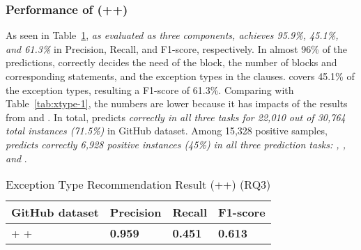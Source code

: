 \subsubsection{Performance of {\tool} ({\xblock}+{\xstate}+{\xtype})}




As seen in Table~\ref{tab:xtype-4}, {\em {\tool} as evaluated as three
  components, achieves 95.9\%, 45.1\%, and 61.3\%} in Precision,
Recall, and F1-score, respectively. In almost 96\% of the predictions,
{\tool} correctly decides the need of the  block, the
number of blocks and corresponding statements, and the exception types
in the  clauses. {\tool} covers 45.1\% of the exception
types, resulting a F1-score of 61.3\%.
%
Comparing with Table~\ref{tab:xtype-1}, the numbers are lower because
it has impacts of the results from \xblock and \xstate. In total,
{\tool} predicts {\em correctly in all three tasks for 22,010 out of
  30,764 total instances (71.5\%)} in GitHub dataset. Among 15,328
positive samples, {\em {\tool} predicts correctly 6,928 positive
  instances (45\%) in all three prediction tasks: {\xblock}, {\xstate}, and {\xtype}}.

\begin{table}[htpb]
  \caption{Exception Type Recommendation Result ({\xblock}+{\xstate}+{\xtype}) (RQ3)}
  \vspace{-12pt}
  \small
	\begin{center}
		\renewcommand{\arraystretch}{1}
		\begin{tabular}{| p{3.10cm}<{\centering} | p{1.2cm}<{\centering} | p{1.2cm}<{\centering}| p{1.2cm}<{\centering}|}
		  \hline
			GitHub dataset  & Precision  & Recall & F1-score \\
			\hline
			\xblock + \xstate  + \xtype  & {\bf 0.959}  &  {\bf 0.451} & {\bf 0.613}\\
			\hline
		\end{tabular}
		\label{tab:xtype-4}
	\end{center}
\end{table}
